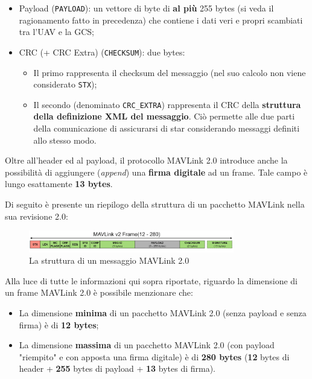 \documentclass[a4paper, 12pt, oneside]{article}
\theoremstyle{definition}
\begin{document}
\begin{itemize}
    \item Payload (\texttt{PAYLOAD}): un vettore di byte di \textbf{al più} 255 bytes (si veda il ragionamento fatto in precedenza) che contiene i dati veri e propri scambiati tra l'UAV e la GCS;
    \item CRC (+ CRC Extra) (\texttt{CHECKSUM}): due bytes: \begin{itemize}
        \item Il primo rappresenta il checksum del messaggio (nel suo calcolo non viene considerato \texttt{STX});
        \item Il secondo (denominato \texttt{CRC\_EXTRA}) rappresenta il CRC della \textbf{struttura della definizione XML del messaggio}. Ciò permette alle due parti della comunicazione di assicurarsi di star considerando messaggi definiti allo stesso modo.
    \end{itemize}
\end{itemize}

Oltre all'header ed al payload, il protocollo MAVLink 2.0 introduce anche la possibilità di aggiungere (\textit{append}) una \textbf{firma digitale} ad un frame. Tale campo è lungo esattamente \textbf{13 bytes}.

\newpage

Di seguito è presente un riepilogo della struttura di un pacchetto MAVLink nella sua revisione 2.0:

\begin{figure}[H]
    \centering
    \includegraphics[width=0.8\textwidth]{images/packet_mavlink_v2.jpg}
    \caption{La struttura di un messaggio MAVLink 2.0}
\end{figure}

Alla luce di tutte le informazioni qui sopra riportate, riguardo la dimensione di un frame MAVLink 2.0 è possibile menzionare che:

\begin{itemize}
    \item La dimensione \textbf{minima} di un pacchetto MAVLink 2.0 (senza payload e senza firma) è di \textbf{12 bytes};
    \item La dimensione \textbf{massima} di un pacchetto MAVLink 2.0 (con payload "riempito" e con apposta una firma digitale) è di \textbf{280 bytes} (\textbf{12} bytes di header + \textbf{255} bytes di payload + \textbf{13} bytes di firma). 
\end{itemize}
\end{document}
